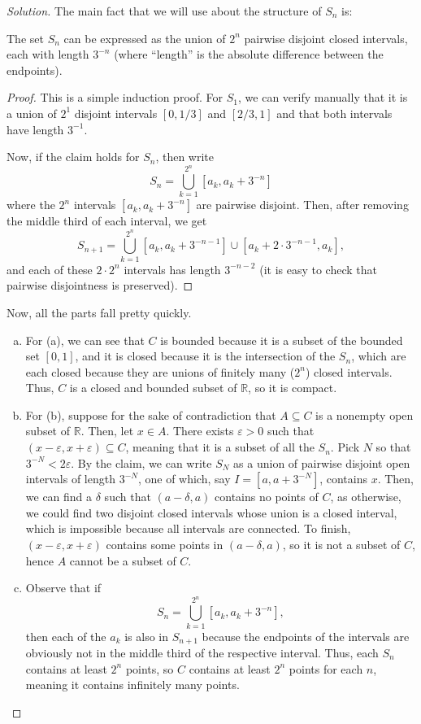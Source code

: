 \documentclass[11pt]{scrartcl}
\providecommand{\eps}{\varepsilon}
\providecommand{\RR}{\mathbb R}
\providecommand{\ii}{\item}
\newenvironment{soln}{\begin{proof}[Solution]}{\end{proof}}
\begin{document}
\begin{soln}
	The main fact that we will use about the structure of $S_n$ is:
	\begin{claim}
		The set $S_n$ can be expressed as
		the union of $2^n$ pairwise disjoint closed intervals,
		each with length $3^{-n}$
		(where ``length'' is the absolute difference between the endpoints).
	\end{claim}
	\begin{proof}
		This is a simple induction proof.
		For $S_1$, we can verify manually that it is a union of
		$2^1$ disjoint intervals $[0,1/3]$ and $[2/3,1]$ and that
		both intervals have length $3^{-1}$.
		
		Now, if the claim holds for $S_n$, then write
		\[S_n = \bigcup_{k=1}^{2^n} [a_k, a_k + 3^{-n}]\]
		where the $2^n$ intervals $[a_k, a_k + 3^{-n}]$ are pairwise disjoint.
		Then, after removing the middle third of each interval, we get
		\[S_{n+1} = \bigcup_{k=1}^{2^n} [a_k, a_k + 3^{-n-1}]\cup
		[a_k + 2\cdot 3^{-n-1}, a_k],\]
		and each of these $2\cdot 2^n$ intervals has length $3^{-n-2}$
		(it is easy to check that pairwise disjointness is preserved).
	\end{proof}
	
	Now, all the parts fall pretty quickly.
	\begin{enumerate}[(a)]
		\ii For (a), we can see that $C$ is bounded because it is a subset
		of the bounded set $[0,1]$, and it is closed because
		it is the intersection of the $S_n$,
		which are each closed because they are unions of finitely many ($2^n$)
		closed intervals. Thus, $C$ is a closed and bounded subset of $\RR$,
		so it is compact.
		\ii For (b), suppose for the sake of contradiction that
		$A\subseteq C$ is a nonempty open subset of $\RR$.
		Then, let $x\in A$. There exists $\eps > 0$ such that
		$(x-\eps, x+\eps)\subseteq C$, meaning that it is
		a subset of all the $S_n$. Pick $N$ so that $3^{-N} < 2\eps$.
		By the claim, we can write $S_N$ as a union of
		pairwise disjoint open intervals of length $3^{-N}$,
		one of which, say $I = [a, a + 3^{-N}]$, contains $x$.
		Then, we can find a $\delta$ such that $(a-\delta,a)$ contains
		no points of $C$, as otherwise, we could find
		two disjoint closed intervals whose union is a closed interval,
		which is impossible because all intervals are connected.
		To finish, $(x-\eps, x+\eps)$ contains some points in
		$(a-\delta, a)$, so it is not a subset of $C$,
		hence $A$ cannot be a subset of $C$.
		\ii Observe that if
		\[S_n = \bigcup_{k=1}^{2^n} [a_k, a_k + 3^{-n}],\]
		then each of the $a_k$ is also in $S_{n+1}$
		because the endpoints of the intervals
		are obviously not in the middle third of the respective interval.
		Thus, each $S_n$ contains at least $2^n$ points,
		so $C$ contains at least $2^n$ points for each $n$,
		meaning it contains infinitely many points.
	\end{enumerate}
\end{soln}
\end{document}
